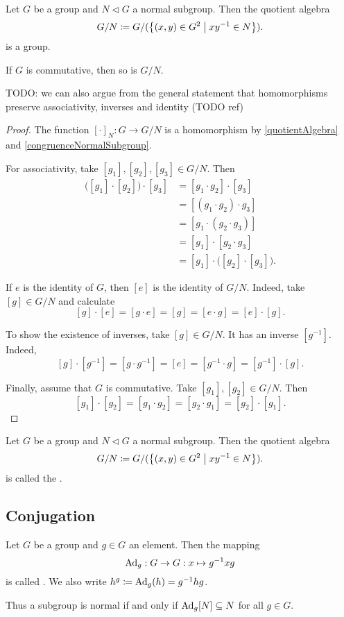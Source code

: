 \begin{proposition} \label{quotientGroup}
Let $G$ be a group and $N\lhd G$ a normal subgroup. Then the quotient algebra
\[ G/N \defeq G/(\setbuilder{(x,y)\in G^2}{xy^{-1}\in N}). \]
is a group.

If $G$ is commutative, then so is $G/N$.
\end{proposition}
TODO: we can also argue from the general statement that homomorphisms preserve associativity, inverses and identity (TODO ref)
\begin{proof}
The function $[\cdot]_N: G\to G/N$ is a homomorphism by \ref{quotientAlgebra} and \ref{congruenceNormalSubgroup}.

For associativity, take $[g_1], [g_2], [g_3] \in G/N$. Then
\begin{align*}
\big([g_1]\cdot [g_2]\big)\cdot[g_3] &= [g_1\cdot g_2]\cdot [g_3] \\
&= [(g_1\cdot g_2) \cdot g_3] \\
&= [g_1\cdot (g_2 \cdot g_3)] \\
&= [g_1] \cdot [g_2 \cdot g_3] \\
&= [g_1] \cdot \big([g_2] \cdot [g_3]\big).
\end{align*}

If $e$ is the identity of $G$, then $[e]$ is the identity of $G/N$. Indeed, take $[g]\in G/N$ and calculate
\[ [g]\cdot[e] = [g\cdot e] = [g] = [e\cdot g] = [e]\cdot [g]. \]

To show the existence of inverses, take $[g]\in G/N$. It has an inverse $[g^{-1}]$. Indeed,
\[ [g]\cdot [g^{-1}] = [g\cdot g^{-1}] = [e] = [g^{-1}\cdot g] = [g^{-1}] \cdot [g]. \]

Finally, assume that $G$ is commutative. Take $[g_1], [g_2]\in G/N$. Then
\[ [g_1]\cdot[g_2] = [g_1\cdot g_2] = [g_2\cdot g_1] = [g_2]\cdot[g_1]. \]
\end{proof}

\begin{definition}
Let $G$ be a group and $N\lhd G$ a normal subgroup. Then the quotient algebra
\[ G/N \defeq G/(\setbuilder{(x,y)\in G^2}{xy^{-1}\in N}). \]
is called the .
\end{definition}

\subsection{Conjugation}
\begin{definition}
Let $G$ be a group and $g\in G$ an element. Then the mapping
\[ \operatorname{Ad}_g: G\to G: x\mapsto g^{-1}xg \]
is called .
We also write $h^g \coloneqq \operatorname{Ad}_g(h) = g^{-1}hg$.
\end{definition}
Thus a subgroup is normal if and only if $\operatorname{Ad}_g[N] \subseteq N$ for all $g\in G$.


